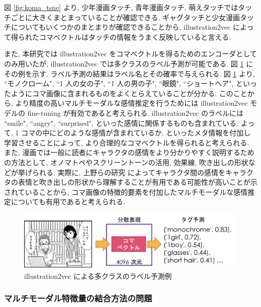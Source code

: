 \newpage
図 \ref{fig:koma_tsne} より, 少年漫画タッチ, 青年漫画タッチ, 萌えタッチではタッチごとに大きくまとまっていることが確認できる. ギャグタッチと少女漫画タッチについてもいくつかのまとまりが確認できることから, illustration2vec によって得られたコマベクトルはタッチの情報をうまく反映していると言える.

また, 本研究では illustration2vec をコマベクトルを得るためのエンコーダとしてのみ用いたが, illustration2vec では多クラスのラベル予測が可能である. 図 \ref{fig:i2v_tag} にその例を示す. ラベル予測の結果はラベル名とその確率で与えられる. 図 \ref{fig:i2v_tag} より, ``モノクローム", ``1 人の女の子", ``1 人の男の子", ``眼鏡", ``ショートヘア", といったようにコマ画像に含まれるものをよくとらえていることが分かる. このことから, より精度の高いマルチモーダルな感情推定を行うためには illustration2vec モデルの fine-tuning が有効であると考えられる. illustration2vec のラベルには ``smile", ``angry", ``surprised", といった感情に関係するものも含まれている. よって, 1 コマの中にどのような感情が含まれているか, といったメタ情報を付加し学習させることによって, より合理的なコマベクトルを得られると考えられる. また, 漫画では一般に読者にキャラクタの感情をより分かりやすく説明するための方法として, オノマトペやスクリーントーンの活用, 効果線, 吹き出しの形状などが挙げられる. 実際に, 上野らの研究 \cite{ueno-emotion2016} によってキャラクタ間の感情をキャラクタの表情と吹き出しの形状から理解することが有用である可能性が高いことが示されていることから, コマ画像の特徴的要素を付加したマルチモーダルな感情推定についても有用であると考えられる.

\begin{figure}[!h]
  \vspace{10mm}
  \centering
  \includegraphics[width=0.9\hsize]{doc/figures/illustration2vec_tag.png}
  \caption{illustration2vec による多クラスのラベル予測例}
  \label{fig:i2v_tag}
\end{figure}

\newpage

\changeindent{0cm}
\subsubsection{マルチモーダル特徴量の結合方法の問題}
\changeindent{2cm}

